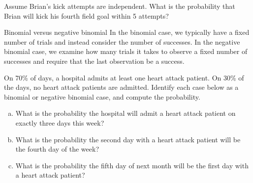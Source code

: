 \begin{exercisewrap}
\begin{nexercise}
Assume Brian's kick attempts are independent. What is the probability that Brian will kick his fourth field goal within 5 attempts?\footnotemark
\end{nexercise}
\end{exercisewrap}

\D{\newpage}

\begin{onebox}{Binomial versus negative binomial}
  In the binomial case, we typically have a fixed number
  of trials and instead consider the number of successes.
  In the negative binomial case, we examine how many trials
  it takes to observe a fixed number of successes and
  require that the last observation be a success.
\end{onebox}

\begin{exercisewrap}
\begin{nexercise}
On 70\% of days, a hospital admits at least one heart attack patient. On 30\% of the days, no heart attack patients are admitted. Identify each case below as a binomial or negative binomial case, and compute the probability.\footnotemark
\begin{enumerate}[(a)]
\setlength{\itemsep}{0mm}
\item What is the probability the hospital will admit
    a heart attack patient on exactly three days this week?

\item What is the probability the second day with a heart
    attack patient will be the fourth day of the week?

\item What is the probability the fifth day of next month
    will be the first day with a heart attack patient?
\end{enumerate}
\end{nexercise}
\end{exercisewrap}

